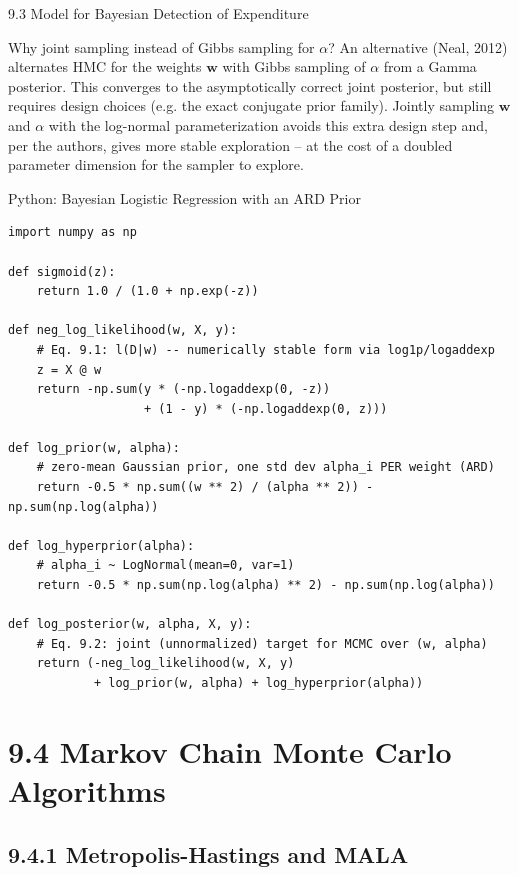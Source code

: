 \documentclass[aspectratio=169,10pt]{beamer}
\newcommand{\vw}{\mathbf{w}}
\begin{document}
\begin{frame}[allowframebreaks]{9.3 Model for Bayesian Detection of Expenditure}
\framebreak

\begin{block}{Why joint sampling instead of Gibbs sampling for $\alpha$?}
An alternative (Neal, 2012) alternates HMC for the weights $\vw$ with Gibbs
sampling of $\alpha$ from a Gamma posterior. This converges to the
asymptotically correct joint posterior, but still requires design choices
(e.g. the exact conjugate prior family). Jointly sampling $\vw$ and $\alpha$
with the log-normal parameterization avoids this extra design step and, per
the authors, gives more stable exploration -- at the cost of a doubled
parameter dimension for the sampler to explore.
\end{block}

\end{frame}

\begin{frame}[fragile]{Python: Bayesian Logistic Regression with an ARD Prior}
\begin{lstlisting}
import numpy as np

def sigmoid(z):
    return 1.0 / (1.0 + np.exp(-z))

def neg_log_likelihood(w, X, y):
    # Eq. 9.1: l(D|w) -- numerically stable form via log1p/logaddexp
    z = X @ w
    return -np.sum(y * (-np.logaddexp(0, -z))
                   + (1 - y) * (-np.logaddexp(0, z)))

def log_prior(w, alpha):
    # zero-mean Gaussian prior, one std dev alpha_i PER weight (ARD)
    return -0.5 * np.sum((w ** 2) / (alpha ** 2)) - np.sum(np.log(alpha))

def log_hyperprior(alpha):
    # alpha_i ~ LogNormal(mean=0, var=1)
    return -0.5 * np.sum(np.log(alpha) ** 2) - np.sum(np.log(alpha))

def log_posterior(w, alpha, X, y):
    # Eq. 9.2: joint (unnormalized) target for MCMC over (w, alpha)
    return (-neg_log_likelihood(w, X, y)
            + log_prior(w, alpha) + log_hyperprior(alpha))
\end{lstlisting}
\end{frame}

\section{9.4 Markov Chain Monte Carlo Algorithms}

\subsection{9.4.1 Metropolis-Hastings and MALA}
\end{document}
